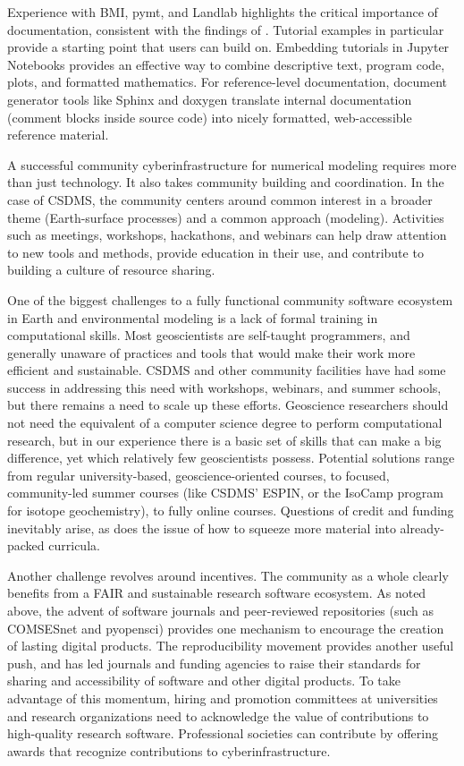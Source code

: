 \documentclass{article} %
\begin{document}
Experience with BMI, pymt, and Landlab highlights the critical importance of documentation, consistent with the findings of \citet{lawrence2015science}. Tutorial examples in particular provide a starting point that users can build on. Embedding tutorials in Jupyter Notebooks provides an effective way to combine descriptive text, program code, plots, and formatted mathematics. For reference-level documentation, document generator tools like Sphinx and doxygen translate internal documentation (comment blocks inside source code) into nicely formatted, web-accessible reference material.

A successful community cyberinfrastructure for numerical modeling requires more than just technology. It also takes community building and coordination. In the case of CSDMS, the community centers around common interest in a broader theme (Earth-surface processes) and a common approach (modeling). Activities such as meetings, workshops, hackathons, and webinars can help draw attention to new tools and methods, provide education in their use, and contribute to building a culture of resource sharing.

One of the biggest challenges to a fully functional community software ecosystem in Earth and environmental modeling is a lack of formal training in computational skills. Most geoscientists are self-taught programmers, and generally unaware of practices and tools that would make their work more efficient and sustainable. CSDMS and other community facilities have had some success in addressing this need with workshops, webinars, and summer schools, but there remains a need to scale up these efforts. Geoscience researchers should not need the equivalent of a computer science degree to perform computational research, but in our experience there is a basic set of skills that can make a big difference, yet which relatively few geoscientists possess. Potential solutions range from regular university-based, geoscience-oriented courses, to focused, community-led summer courses (like CSDMS' ESPIN, or the IsoCamp program for isotope geochemistry), to fully online courses. Questions of credit and funding inevitably arise, as does the issue of how to squeeze more material into already-packed curricula.  

Another challenge revolves around incentives. The community as a whole clearly benefits from a FAIR and sustainable research software ecosystem. As noted above, the advent of software journals and peer-reviewed repositories (such as COMSESnet and pyopensci) provides one mechanism to encourage the creation of lasting digital products. The reproducibility movement provides another useful push, and has led journals and funding agencies to raise their standards for sharing and accessibility of software and other digital products. To take advantage of this momentum, hiring and promotion committees at universities and research organizations need to acknowledge the value of contributions to high-quality research software. Professional societies can contribute by offering awards that recognize contributions to cyberinfrastructure.
\end{document}
